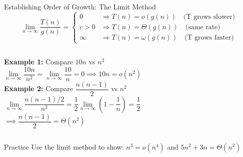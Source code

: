 \documentclass[aspectratio=169]{beamer}
\begin{document}
\begin{frame}[shrink=12]{Establishing Order of Growth: The Limit Method}
  \[
    \lim_{n\to\infty}\frac{T(n)}{g(n)} =
    \begin{cases}
      0       & \Rightarrow T(n) = o(g(n)) \quad\text{(T grows slower)} \\
      c > 0   & \Rightarrow T(n) = \Theta(g(n)) \quad\text{(same rate)} \\
      \infty  & \Rightarrow T(n) = \omega(g(n)) \quad\text{(T grows faster)}
    \end{cases}
  \]
  \vspace{0.3em}
  \begin{columns}[T]
      \textbf{Example 1:} Compare $10n$ vs $n^2$
      \[
        \lim_{n\to\infty}\frac{10n}{n^2} = \lim_{n\to\infty}\frac{10}{n} = 0
        \implies 10n = o(n^2)
      \]
      \textbf{Example 2:} Compare $\dfrac{n(n-1)}{2}$ vs $n^2$
      \[
        \lim_{n\to\infty}\frac{n(n-1)/2}{n^2}
        = \frac{1}{2}\lim_{n\to\infty}\!\left(1 - \frac{1}{n}\right)
        = \frac{1}{2}
      \]
      $\implies \dfrac{n(n-1)}{2} = \Theta(n^2)$
  \end{columns}
  \vspace{0.4em}
  \begin{exampleblock}{Practice}
    Use the limit method to show: $n^3 = o(n^4)$ and $5n^2+3n = \Theta(n^2)$
  \end{exampleblock}
\end{frame}
\end{document}
